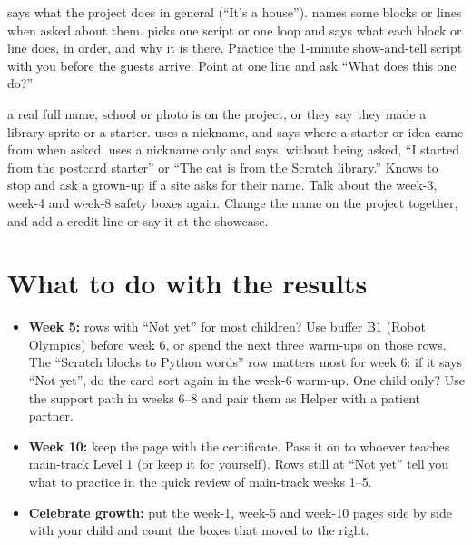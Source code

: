   {says what the project does in general (\enquote{It's a house}).}
  {names some blocks or lines when asked about them.}
  {picks one script or one loop and says what each block or line does, in order, and why it is there.}
  {Practice the 1-minute show-and-tell script with you before the guests arrive. Point at one line and ask \enquote{What does this one do?}}

  {a real full name, school or photo is on the project, or they say they made a library sprite or a starter.}
  {uses a nickname, and says where a starter or idea came from when asked.}
  {uses a nickname only and says, without being asked, \enquote{I started from the postcard starter} or \enquote{The cat is from the Scratch library.} Knows to stop and ask a grown-up if a site asks for their name.}
  {Talk about the week-3, week-4 and week-8 safety boxes again. Change the name on the project together, and add a credit line or say it at the showcase.}

\section{What to do with the results}
\begin{itemize}[itemsep=2pt]
  \item \textbf{Week 5:} rows with \enquote{Not yet} for most children? Use buffer B1 (Robot Olympics)
        before week 6, or spend the next three warm-ups on those rows. The \enquote{Scratch blocks to
        Python words} row matters most for week 6: if it says \enquote{Not yet}, do the card sort again in
        the week-6 warm-up. One child only? Use the support path in weeks 6--8 and pair them as Helper
        with a patient partner.
  \item \textbf{Week 10:} keep the page with the certificate. Pass it on to whoever teaches main-track
        Level 1 (or keep it for yourself). Rows still at \enquote{Not yet} tell you what to practice in
        the quick review of main-track weeks 1--5.
  \item \textbf{Celebrate growth:} put the week-1, week-5 and week-10 pages side by side with your child
        and count the boxes that moved to the right.
\end{itemize}
